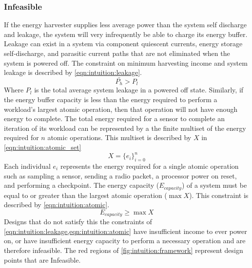 \subsubsection{Infeasible} 
If the energy harvester supplies less average power than
the system self discharge and leakage, the system will very infrequently be able to charge its energy buffer.
Leakage can exist in a system via component quiescent currents, energy storage self-discharge, and parasitic current paths that are not eliminated when the system is powered off. 
The constraint on minimum harvesting income and system leakage is described by \cref{eqn:intuition:leakage}.
\begin{equation}
    \label{eqn:intuition:leakage}
    \bar{P_h} > P_l
\end{equation}
Where $P_l$ is the total average system leakage in a powered off state.
Similarly, if the energy buffer capacity is less than the
energy required to perform a workload's largest atomic operation, 
then that operation will not have enough energy to
complete.
The total energy required for a sensor to complete an iteration of its workload can be represented by a the finite multiset of the energy required for $n$ atomic operations. This multiset is described by $X$ in \cref{eqn:intuition:atomic_set}%
\begin{equation} \label{eqn:intuition:atomic_set}
    X = \{e_i\}_{i=0}^n 
\end{equation}
Each individual $e_{i}$ represents the energy required for a single atomic operation such as sampling a sensor,
sending a radio packet, a processor power on reset, and performing a checkpoint.
The energy capacity ($E_{capacity}$) of a system must be equal to or greater than the largest atomic operation ($\max X$). 
This constraint is described by  \cref{eqn:intuition:atomic}.
\begin{equation}
    \label{eqn:intuition:atomic}
    E_{capacity} \geq \max X
\end{equation}
Designs that do not satisfy this the constraints of \cref{eqn:intuition:leakage,eqn:intuition:atomic} have insufficient income to ever power on, or have insufficient energy capacity to perform a necessary operation and are  
therefore infeasible.
The red regions of \cref{fig:intuition:framework} represent design points that are \textsf{Infeasible}. 

